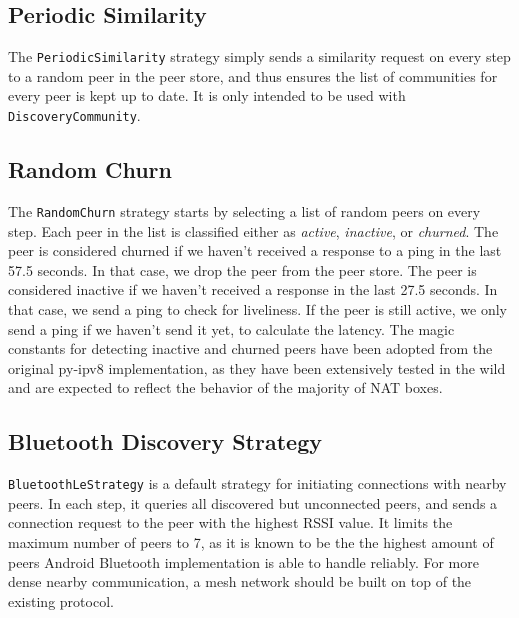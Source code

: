 \subsection{Periodic Similarity}

The \texttt{PeriodicSimilarity} strategy simply sends a similarity request on every step to a random peer in the peer store, and thus ensures the list of communities for every peer is kept up to date. It is only intended to be used with \texttt{DiscoveryCommunity}.

\subsection{Random Churn}

The \texttt{RandomChurn} strategy starts by selecting a list of random peers on every step. Each peer in the list is classified either as \textit{active}, \textit{inactive}, or \textit{churned}. The peer is considered churned if we haven't received a response to a ping in the last 57.5 seconds. In that case, we drop the peer from the peer store. The peer is considered inactive if we haven't received a response in the last 27.5 seconds. In that case, we send a ping to check for liveliness. If the peer is still active, we only send a ping if we haven't send it yet, to calculate the latency. The magic constants for detecting inactive and churned peers have been adopted from the original py-ipv8 implementation, as they have been extensively tested in the wild and are expected to reflect the behavior of the majority of NAT boxes. \cite{nat_wild}

\subsection{Bluetooth Discovery Strategy}

\texttt{BluetoothLeStrategy} is a default strategy for initiating connections with nearby peers. In each step, it queries all discovered but unconnected peers, and sends a connection request to the peer with the highest RSSI value. It limits the maximum number of peers to 7, as it is known to be the the highest amount of peers Android Bluetooth implementation is able to handle reliably. For more dense nearby communication, a mesh network should be built on top of the existing protocol.




